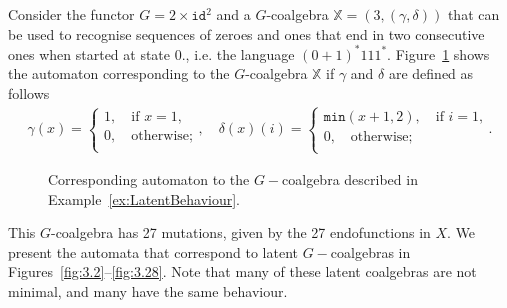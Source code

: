 \begin{example}
\label{ex:LatentBehaviour}
Consider the functor $G=2\times \texttt{id}^2$ and a $G$-coalgebra $\mathbb{X}=(3,(\gamma,\delta))$ that can be used to recognise sequences of zeroes and ones that end in two consecutive ones when started at state 0., i.e. the language $(0+1)^*111^*$. Figure~\ref{fig:ExampleLatent} shows the automaton corresponding to the $G$-coalgebra $\mathbb{X}$ if $\gamma$ and $\delta$ are defined as follows
\begin{align}
\gamma(x)=\begin{cases}
1, \quad \text{if  $x=1$,}\\
0, \quad \text{otherwise;}\\
\end{cases},\quad
\delta(x)(i)=\begin{cases}
\texttt{min}(x+1,2), \quad \text{if  $i=1$,}\\
0, \quad \text{otherwise;}\\
\end{cases}.
\end{align}

\begin{figure}[t]
\centering
{}
\caption{Corresponding automaton to the $G-$coalgebra described in Example~\ref{ex:LatentBehaviour}.}
\label{fig:ExampleLatent}
\end{figure}

This $G$-coalgebra has 27 mutations, given by the 27 endofunctions in $X$. We present the automata that correspond to latent $G-$coalgebras in Figures~\ref{fig:3.2}--\ref{fig:3.28}. Note that many of these latent coalgebras are not minimal, and many have the same behaviour.


\end{example}
